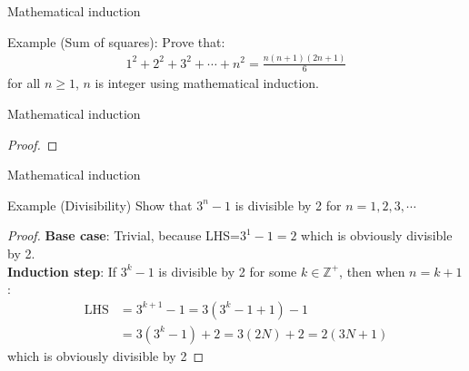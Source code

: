 \documentclass[10pt,xcolor={table,dvipsnames},t]{beamer}
\begin{document}
\begin{frame}{Mathematical induction}
  \begin{exampleblock}{Example (Sum of squares):}
    Prove that:
    \begin{align*}
      1^2 + 2^2 + 3^2 + \cdots + n^2 = \frac{n(n+1)(2n+1)}{6}
    \end{align*}
    for all $n\geq 1$, $n$ is integer using mathematical induction.
  \end{exampleblock}
\end{frame}
\begin{frame}{Mathematical induction}
  \begin{proof}
    
  \end{proof}
\end{frame}

\begin{frame}{Mathematical induction}
  \begin{exampleblock}{Example (Divisibility)}
    Show that $3^n-1$ is divisible by 2 for $n=1,2,3,\cdots$
  \end{exampleblock}
  \begin{proof}
    \textbf{Base case}: Trivial, because LHS=$3^1-1=2$ which is obviously divisible by 2.\\
    \textbf{Induction step}: If $3^k-1$ is divisible by 2 for some $k \in \mathbb{Z}^+$, then when $n=k+1$:
    \begin{align*}
      \text{LHS} &= 3^{k+1} - 1 = 3(3^{k}-1+1)-1 \\
      &= 3(3^{k}-1)+ 2 = 3(2N) + 2 = 2(3N + 1)
    \end{align*}
    which is obviously divisible by 2
  \end{proof}
\end{frame}
\end{document}
